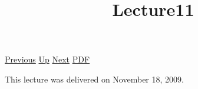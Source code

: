 \documentclass[12pt,a4paper]{report}
\begin{document}
 \href{doc/phil/People/Brandom/OnSellars/2009/Lecture10.html}{Previous} 
 \href{doc/phil/People/Brandom/OnSellars/2009.html}{Up} 
 \href{doc/phil/People/Brandom/OnSellars/2009/Lecture12.html}{Next} 
 \href{doc/phil/People/Brandom/OnSellars/2009/Lecture11.pdf}{PDF} 
\title{Lecture11}

\tableofcontents
This lecture was delivered on November 18, 2009.
\end{document}
